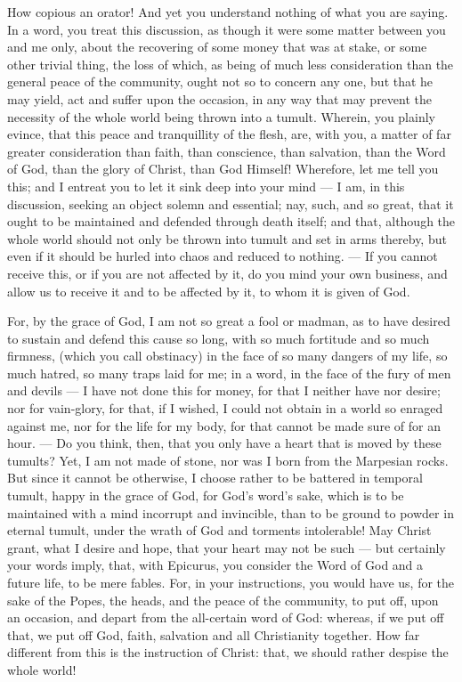 How copious an orator! And yet you understand nothing of what you are saying. In a word, you treat this discussion, as though it were some matter between you and me only, about the recovering of some money that was at stake, or some other trivial thing, the loss of which, as being of much less consideration than the general peace of the community, ought not so to concern any one, but that he may yield, act and suffer upon the occasion, in any way that may prevent the necessity of the whole world being thrown into a tumult. Wherein, you plainly evince, that this peace and tranquillity of the flesh, are, with you, a matter of far greater consideration than faith, than conscience, than salvation, than the Word of God, than the glory of Christ, than God Himself! Wherefore, let me tell you this; and I entreat you to let it sink deep into your mind — I am, in this discussion, seeking an object solemn and essential; nay, such, and so great, that it ought to be maintained and defended through death itself; and that, although the whole world should not only be thrown into tumult and set in arms thereby, but even if it should be hurled into chaos and reduced to nothing. — If you cannot receive this, or if you are not affected by it, do you mind your own business, and allow us to receive it and to be affected by it, to whom it is given of God.

For, by the grace of God, I am not so great a fool or madman, as to have desired to sustain and defend this cause so long, with so much fortitude and so much firmness, (which you call obstinacy) in the face of so many dangers of my life, so much hatred, so many traps laid for me; in a word, in the face of the fury of men and devils — I have not done this for money, for that I neither have nor desire; nor for vain-glory, for that, if I wished, I could not obtain in a world so enraged against me, nor for the life for my body, for that cannot be made sure of for an hour. — Do you think, then, that you only have a heart that is moved by these tumults? Yet, I am not made of stone, nor was I born from the Marpesian rocks. But since it cannot be otherwise, I choose rather to be battered in temporal tumult, happy in the grace of God, for God’s word’s sake, which is to be maintained with a mind incorrupt and invincible, than to be ground to powder in eternal tumult, under the wrath of God and torments intolerable! May Christ grant, what I desire and hope, that your heart may not be such — but certainly your words imply, that, with Epicurus, you consider the Word of God and a future life, to be mere fables. For, in your instructions, you would have us, for the sake of the Popes, the heads, and the peace of the community, to put off, upon an occasion, and depart from the all-certain word of God: whereas, if we put off that, we put off God, faith, salvation and all Christianity together. How far different from this is the instruction of Christ: that, we should rather despise the whole world!

